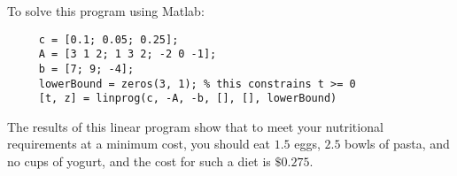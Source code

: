\vspace{3mm} 

To solve this program using Matlab:
\begin{verbatim}
     c = [0.1; 0.05; 0.25];
     A = [3 1 2; 1 3 2; -2 0 -1];
     b = [7; 9; -4];
     lowerBound = zeros(3, 1); % this constrains t >= 0
     [t, z] = linprog(c, -A, -b, [], [], lowerBound)
\end{verbatim}

The results of this linear program show that to meet your nutritional
requirements at a minimum cost, you should eat $1.5$ eggs, $2.5$ bowls of
pasta, and no cups of yogurt, and the cost for such a diet is $\$0.275$.



